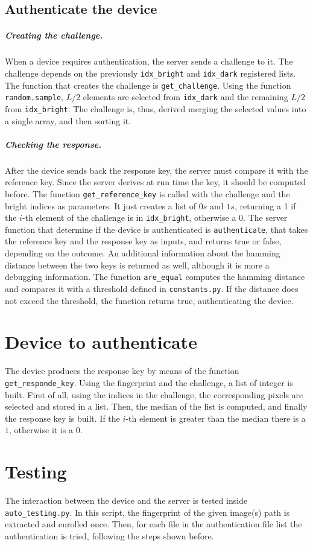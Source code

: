 \begin{enumerate}
        \subsection{Authenticate the device}\label{sec:authdevice}
        \subparagraph{Creating the challenge.}
        When a device requires authentication, the server sends a challenge to it. The challenge depends on the previously \texttt{idx\_bright} and \texttt{idx\_dark} registered lists.
        The function that creates the challenge is \texttt{get\_challenge}. Using the function \texttt{random.sample}, $L/2$ elements are selected from \texttt{idx\_dark} and the remaining $L/2$ from \texttt{idx\_bright}. The challenge is, thus, derived merging the selected values into a single array, and then sorting it.

        \subparagraph{Checking the response.}
        After the device sends back the response key, the server must compare it with the reference key. Since the server derives at run time the key, it should be computed before. The function \texttt{get\_reference\_key} is called with the challenge and the bright indices as parameters. It just creates a list of $0s$ and $1s$, returning a 1 if the $i$-th element of the challenge is in \texttt{idx\_bright}, otherwise a 0.
        The server function that determine if the device is authenticated is \texttt{authenticate}, that takes the reference key and the response key as inputs, and returns true or false, depending on the outcome. An additional information about the hamming distance between the two keys is returned as well, although it is more a debugging information. The function \texttt{are\_equal} computes the hamming distance and compares it with a threshold defined in \texttt{constants.py}. If the distance does not exceed the threshold, the function returns true, authenticating the device.

        \section{Device to authenticate}\label{sec:device2authenticate}
        The device produces the response key by means of the function \texttt{get\_responde\_key}. Using the fingerprint and the challenge, a list of integer is built. First of all, using the indices in the challenge, the corresponding pixels are selected and stored in a list. Then, the median of the list is computed, and finally the response key is built. If the $i$-th element is greater than the median there is a $1$, otherwise it is a $0$.

        \section{Testing}\label{sec:testing}
        The interaction between the device and the server is tested inside \texttt{auto\_testing.py}. In this script, the fingerprint of the given image(s) path is extracted and enrolled once. Then, for each file in the authentication file list the authentication is tried, following the steps shown before.
\end{enumerate}
